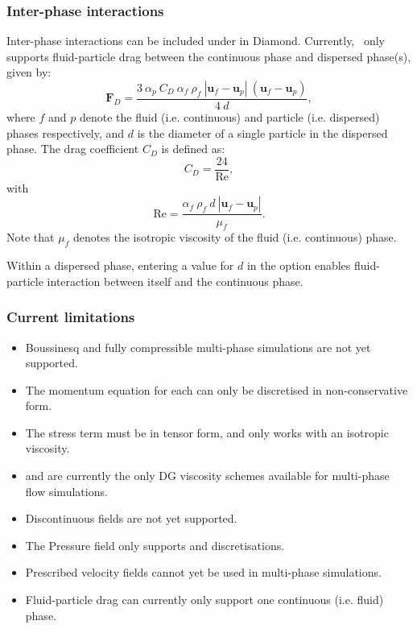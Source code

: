 \subsubsection{Inter-phase interactions}
Inter-phase interactions can be included under  in Diamond. Currently, \fluidity\ only supports fluid-particle drag between the continuous phase and dispersed phase(s), given by:
\begin{equation}\label{eq:multiphase_drag_term}
\mathbf{F}_D = \frac{3\ \alpha_p\ C_D\ \alpha_f\ \rho_f\ |\mathbf{u}_f-\mathbf{u}_p|\ (\mathbf{u}_f-\mathbf{u}_p)}{4\ d},
\end{equation}
where $f$ and $p$ denote the fluid (i.e. continuous) and particle (i.e. dispersed) phases respectively, and $d$ is the diameter of a single particle in the dispersed phase. The drag coefficient $C_D$ is defined as:
\begin{equation}\label{eq:drag_coefficient}
C_D = \frac{24}{\mathrm{Re}},
\end{equation}
with
\begin{equation}\label{eq:particle_reynolds_number}
\mathrm{Re} = \frac{\alpha_f\ \rho_f\ d\ |\mathbf{u}_f-\mathbf{u}_p|}{\mu_f}.
\end{equation}
Note that $\mu_f$ denotes the isotropic viscosity of the fluid (i.e. continuous) phase.

Within a dispersed phase, entering a value for $d$ in the  option enables fluid-particle interaction between itself and the continuous phase.

\subsubsection{Current limitations}
\begin{itemize}
 \item Boussinesq and fully compressible multi-phase simulations are not yet supported.
 \item The momentum equation for each  can only be discretised in non-conservative form.
 \item The stress term must be in tensor form, and only works with an isotropic viscosity.
 \item {} and  are currently the only DG viscosity schemes available for multi-phase flow simulations.
 \item Discontinuous  fields are not yet supported.
 \item The Pressure field only supports  and  discretisations.
 \item Prescribed velocity fields cannot yet be used in multi-phase simulations.
 \item Fluid-particle drag can currently only support one continuous (i.e. fluid) phase.
\end{itemize}


